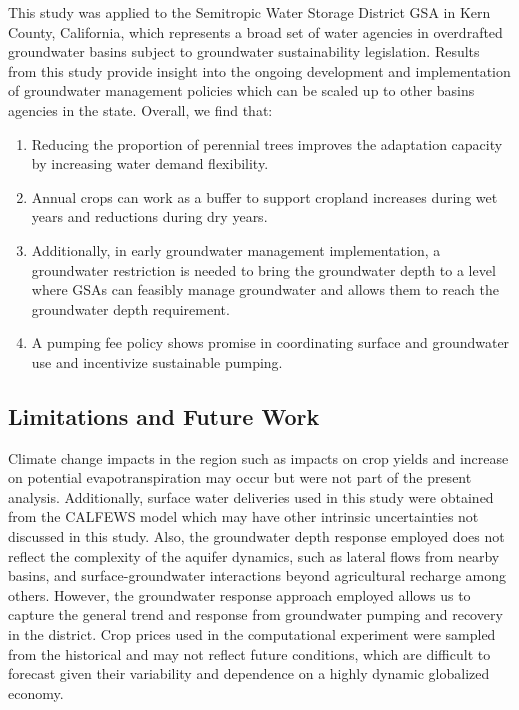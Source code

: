 \documentclass[a4paper,fleqn]{cas-sc}
\begin{document}
This study was applied to the Semitropic Water Storage District GSA in Kern County, California, which represents a broad set of water agencies in overdrafted groundwater basins subject to groundwater sustainability legislation. Results from this study provide insight into the ongoing development and implementation of groundwater management policies which can be scaled up to other basins agencies in the state. Overall, we find that:  

\begin{enumerate}
    \item   Reducing the proportion of perennial trees improves the adaptation capacity by increasing water demand flexibility.  
    \item  Annual crops can work as a buffer to support cropland increases during wet years and reductions during dry years.
    \item  Additionally, in early groundwater management implementation, a groundwater restriction is needed to bring the groundwater depth to a level where GSAs can feasibly manage groundwater and allows them to reach the groundwater depth requirement.
    \item  A pumping fee policy shows promise in coordinating surface and groundwater use and incentivize sustainable pumping. 
\end{enumerate}


\subsection{Limitations and Future Work}

Climate change impacts in the region such as impacts on crop yields \citep{blanc_is_2017} and increase on potential evapotranspiration \citep{mcevoy_projected_2020,vahmani_will_2022} may occur but were not part of the present analysis. Additionally, surface water deliveries used in this study were obtained from the CALFEWS model \citep{zeff_californias_2021} which may have other intrinsic uncertainties not discussed in this study. Also, the groundwater depth response employed does not reflect the complexity of the aquifer dynamics, such as lateral flows from nearby basins, and surface-groundwater interactions beyond agricultural recharge among others. However, the groundwater response approach employed allows us to capture the general trend and response from groundwater pumping and recovery in the district. Crop prices used in the computational experiment were sampled from the historical and may not reflect future conditions, which are difficult to forecast given their variability and dependence on a highly dynamic globalized economy. 
\end{document}
